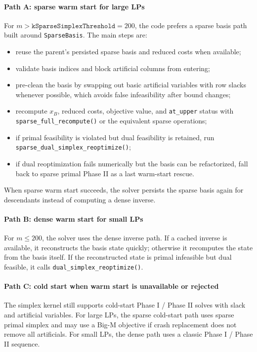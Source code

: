 \paragraph{Path A: sparse warm start for large LPs}
For \(m > \texttt{kSparseSimplexThreshold} = 200\), the code prefers a sparse basis path built around \texttt{SparseBasis}. The main steps are:
\begin{itemize}
  \item reuse the parent's persisted sparse basis and reduced costs when available;
  \item validate basis indices and block artificial columns from entering;
  \item pre-clean the basis by swapping out basic artificial variables with row slacks whenever possible, which avoids false infeasibility after bound changes;
  \item recompute \(x_B\), reduced costs, objective value, and \texttt{at\_upper} status with \texttt{sparse\_full\_recompute()} or the equivalent sparse operations;
  \item if primal feasibility is violated but dual feasibility is retained, run \texttt{sparse\_dual\_simplex\_reoptimize()};
  \item if dual reoptimization fails numerically but the basis can be refactorized, fall back to sparse primal Phase II as a last warm-start rescue.
\end{itemize}

When sparse warm start succeeds, the solver persists the sparse basis again for descendants instead of computing a dense inverse.

\paragraph{Path B: dense warm start for small LPs}
For \(m \le 200\), the solver uses the dense inverse path. If a cached inverse is available, it reconstructs the basis state quickly; otherwise it recomputes the state from the basis itself. If the reconstructed state is primal infeasible but dual feasible, it calls \texttt{dual\_simplex\_reoptimize()}.

\paragraph{Path C: cold start when warm start is unavailable or rejected}
The simplex kernel still supports cold-start Phase I / Phase II solves with slack and artificial variables. For large LPs, the sparse cold-start path uses sparse primal simplex and may use a Big-M objective if crash replacement does not remove all artificials. For small LPs, the dense path uses a classic Phase I / Phase II sequence.

